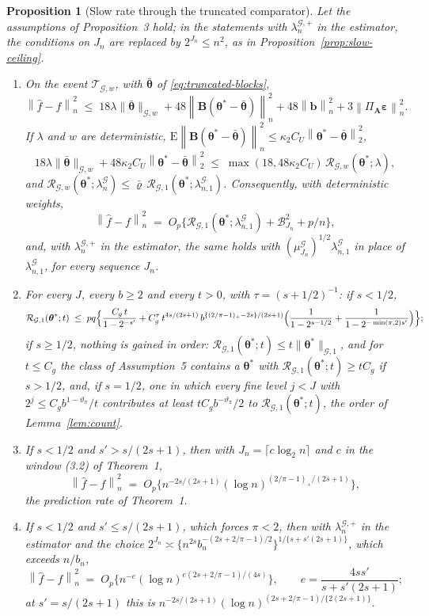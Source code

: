 \documentclass[10pt]{book}
\newtheorem{proposition}{Proposition}[section]
\theoremstyle{definition}
\newcommand{\E}{\mathrm{E}}
\newcommand{\norm}[1]{\left\lVert #1 \right\rVert}
\newcommand{\normn}[1]{\left\lVert #1 \right\rVert_{n}}
\newcommand{\lev}{j}
\newcommand{\btheta}{\boldsymbol{\theta}}
\newcommand{\thetastar}{\btheta^{*}}
\newcommand{\pen}{\lambda}
\newcommand{\seff}{s'}
\newcommand{\Amat}{\mathbf{A}}
\newcommand{\Bmat}{\mathbf{B}}
\newcommand{\PA}{\Pi_{\Amat}}
\newcommand{\bveps}{\boldsymbol{\varepsilon}}
\newcommand{\bb}{\mathbf{b}}
\newcommand{\thbar}{\bar{\btheta}}
\newcommand{\Gcal}{\mathcal{G}}
\newcommand{\bn}{b_{n}}
\newcommand{\nGw}[1]{\lVert #1\rVert_{\mathcal{G},w}}
\newcommand{\nGone}[1]{\lVert #1\rVert_{\mathcal{G},1}}
\newcommand{\lamG}{\lambda^{\mathcal{G}}_{n}}
\newcommand{\lamGone}{\lambda^{\mathcal{G}}_{n,1}}
\newcommand{\lamGp}{\lambda^{\mathcal{G},+}_{n}}   %
\newcommand{\Tw}{\mathcal{T}_{\mathcal{G},w}}
\newcommand{\RGw}{\mathcal{R}_{\mathcal{G},w}}
\newcommand{\RGone}{\mathcal{R}_{\mathcal{G},1}}
\begin{document}
{\begin{proposition}[Slow rate through the truncated comparator]
\label{prop:truncated}
Let the assumptions of Proposition~3 hold; in the statements with $\lamGp$
in the estimator, the conditions on $J_n$ are replaced by $2^{J_n} \le n^{2}$,
as in Proposition~\ref{prop:slow-ceiling}.
\begin{enumerate}
\item[(i)] On the event $\Tw$, with $\thbar$ of \eqref{eq:truncated-blocks},
\[
  \normn{\widehat{f}-f}^{2}
  \;\le\; 18\pen\nGw{\thbar} + 48\normn{\Bmat(\thetastar-\thbar)}^{2}
  + 48\normn{\bb}^{2} + 3\normn{\PA\bveps}^{2} .
\]
If $\pen$ and $w$ are deterministic,
$\E\normn{\Bmat(\thetastar-\thbar)}^{2} \le
\kappa_2C_U\norm{\thetastar-\thbar}_{2}^{2}$,
\[
  18\pen\nGw{\thbar} + 48\kappa_2C_U\norm{\thetastar-\thbar}_{2}^{2}
  \;\le\; \max(18,48\kappa_2C_U)\,\RGw(\thetastar;\pen),
\]
and $\RGw(\thetastar;\lamG) \le \bar\varrho\,\RGone(\thetastar;\lamGone)$.
Consequently, with deterministic weights,
\[
  \normn{\widehat{f}-f}^{2} \;=\; O_p\bigl\{\RGone(\thetastar;\lamGone)
  + \mathcal{B}_{J_n}^{2} + p/n\bigr\},
\]
and, with $\lamGp$ in the estimator, the same holds with
$(\mu^{\Gcal}_{J_n})^{1/2}\lamGone$ in place of $\lamGone$, for every sequence
$J_n$.
\item[(ii)] For every $J$, every $b \ge 2$ and every $t > 0$, with
$\tau = (s+1/2)^{-1}$: if $s < 1/2$,
\begin{equation}
  \label{eq:count-truncated}
  \RGone(\thetastar;t) \;\le\; pq\Bigl\{\frac{C_g\,t}{1-2^{-\seff}}
  + C_g^{\tau}\,t^{4s/(2s+1)}\,b^{\{(2/\pi-1)_{+}-2s\}/(2s+1)}
  \Bigl(\frac{1}{1-2^{s-1/2}} + \frac{1}{1-2^{-\min(\pi,2)\seff}}\Bigr)\Bigr\};
\end{equation}
if $s \ge 1/2$, nothing is gained in order: $\RGone(\thetastar;t) \le
t\nGone{\thetastar}$, and for $t \le C_g$ the class of Assumption~5 contains a
$\thetastar$ with $\RGone(\thetastar;t) \ge tC_g$ if $s > 1/2$, and, if
$s = 1/2$, one in which every fine level $\lev < J$ with
$2^{\lev} \le C_gb^{1-\vartheta_{\pi}}/t$ contributes at least
$tC_gb^{-\vartheta_{\pi}}/2$ to $\RGone(\thetastar;t)$, the order of
Lemma~\ref{lem:count}.
\item[(iii)] If $s < 1/2$ and $\seff > s/(2s+1)$, then with
$J_n = \lceil c\log_2 n\rceil$ and $c$ in the window (3.2) of Theorem~1,
\[
  \normn{\widehat{f}-f}^{2}
  \;=\; O_p\bigl\{n^{-2s/(2s+1)}(\log n)^{(2/\pi-1)_{+}/(2s+1)}\bigr\},
\]
the prediction rate of Theorem~1.
\item[(iv)] If $s < 1/2$ and $\seff \le s/(2s+1)$, which forces $\pi < 2$,
then with $\lamGp$ in the estimator and the choice
$2^{J_n} \asymp \{n^{2s}\bn^{-(2s+2/\pi-1)/2}\}^{1/\{s+\seff(2s+1)\}}$, which
exceeds $n/\bn$,
\[
  \normn{\widehat{f}-f}^{2}
  \;=\; O_p\bigl\{n^{-e}(\log n)^{e(2s+2/\pi-1)/(4s)}\bigr\},
  \qquad e = \frac{4s\seff}{s+\seff(2s+1)} ;
\]
at $\seff = s/(2s+1)$ this is
$n^{-2s/(2s+1)}(\log n)^{(2s+2/\pi-1)/\{2(2s+1)\}}$.
\end{enumerate}
\end{proposition}

}
\end{document}
